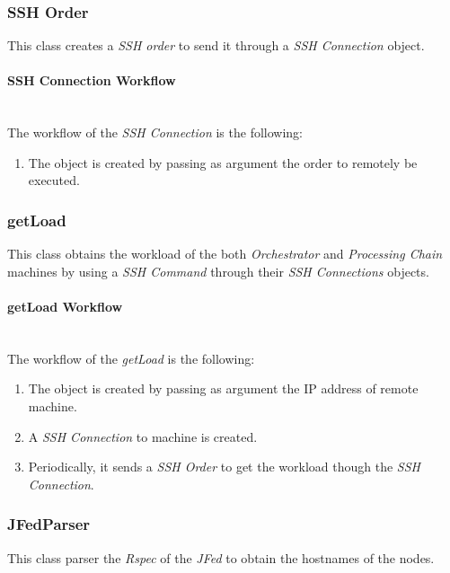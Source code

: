 \subsubsection{SSH Order}

This class creates a \emph{SSH order} to send it through a \emph{SSH Connection} object.

\paragraph{SSH Connection Workflow}~\\

The workflow of the \emph{SSH Connection} is the following:
\begin{enumerate}
\item The object is created by passing as argument the order to remotely be executed.
\end{enumerate}

\subsubsection{getLoad}

This class obtains the  workload of the both \emph{Orchestrator} and  \emph{Processing Chain} machines by using a \emph{SSH Command} through their \emph{SSH Connections} objects.

\paragraph{getLoad Workflow}~\\

The workflow of the \emph{getLoad} is the following:
\begin{enumerate}
\item The object is created by passing as argument the \ac{IP} address of remote machine.
\item A \emph{SSH Connection} to machine is created.
\item Periodically, it sends a \emph{SSH Order} to get the workload though the \emph{SSH Connection}.
\end{enumerate}

\subsubsection{JFedParser}

This class parser the  \emph{Rspec} of the \emph{JFed} to obtain the hostnames of the \vw nodes.

